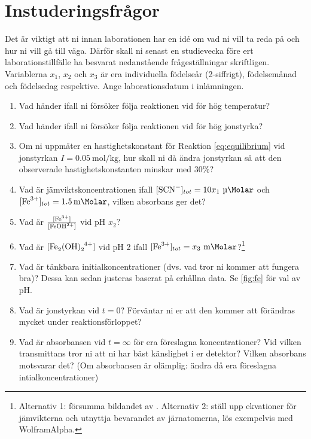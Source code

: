 \section{Instuderingsfrågor}
\label{sec:instudering}
Det är viktigt att ni innan laborationen har en idé om vad ni vill ta
reda på och hur ni vill gå till väga. Därför skall ni senast en studievecka
före ert laborationstillfälle ha besvarat nedanstående frågeställningar
skriftligen.
Variablerna $x_1$, $x_2$ och $x_3$
är era individuella födelseår
(2-siffrigt), födelsemånad och födelsedag respektive. Ange
laborationsdatum i inlämningen.

\begin{enumerate}
\item Vad händer ifall ni försöker följa reaktionen vid för hög
  temperatur?
\item Vad händer ifall ni försöker följa reaktionen vid för hög
  jonstyrka?
\item Om ni uppmäter en hastighetskonstant för Reaktion \ref{eq:equilibrium} vid
  jonstyrkan $I = \SI{0.05}{\mole\per\kg}$, hur skall ni då ändra
  jonstyrkan så att den observerade hastighetskonstanten minskar med 30\%?
\item Vad är jämviktskoncentrationen  ifall
  $[\ce{SCN^{-}}]_{tot} = 10 x_1~\si{\micro\Molar}$ och 
  $[\ce{Fe^{3+}}]_{tot} = \SI{1.5}{\milli\Molar}$, vilken absorbans ger det?
\item Vad är $\frac{[\ce{Fe^{3+}}]}{[\ce{FeOH^{2+}}]}$ vid pH $x_2$?
\item Vad är $[\ce{Fe_2(OH)_2^{4+}}]$ vid pH 2 ifall
  $[\ce{Fe^{3+}}]_{tot} = x_3~\si{\milli\Molar}$?\footnote{
Alternativ 1: försumma bildandet av . Alternativ 2: ställ upp ekvationer
för jämvikterna och utnyttja bevarandet av järnatomerna, lös
exempelvis med WolframAlpha.
}
\item Vad är tänkbara initialkoncentrationer (dvs. vad tror ni kommer att
  fungera bra)? Dessa kan sedan justeras baserat på erhållna data. Se
  \cref{fig:fe} för val av pH.
\item Vad är jonstyrkan vid $t=0$? Förväntar ni er att den kommer att
  förändras mycket under reaktionsförloppet?
\item Vad är absorbansen vid $t=\infty$ för era föreslagna
  koncentrationer? Vid vilken transmittans tror ni att ni har bäst
  känslighet i er detektor? Vilken absorbans motsvarar det? (Om
  absorbansen är olämplig: ändra då era föreslagna intialkoncentrationer)
\end{enumerate}

